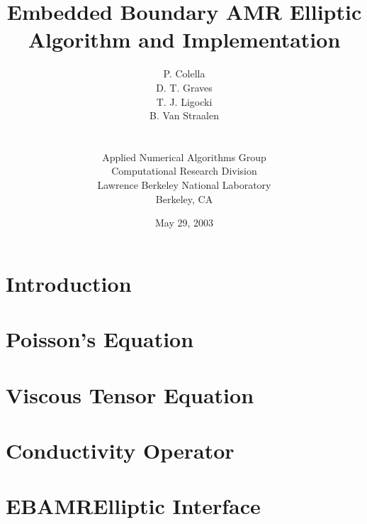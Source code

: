 \documentclass[12pt]{report}
\title{Embedded Boundary AMR Elliptic Algorithm and Implementation}
\author{P. Colella \\
        D. T. Graves \\ 
        T. J. Ligocki \\ 
        B. Van Straalen \\
        \\ \\
Applied Numerical Algorithms Group \\
Computational Research Division \\
Lawrence Berkeley National Laboratory \\
Berkeley, CA}
\date{May 29, 2003}
\begin{document}
\maketitle

\tableofcontents

\chapter{Introduction}


\chapter{Poisson's Equation}

%
\chapter{Viscous Tensor Equation}

%
\chapter{Conductivity Operator}

\chapter{EBAMRElliptic Interface}



\end{document}
